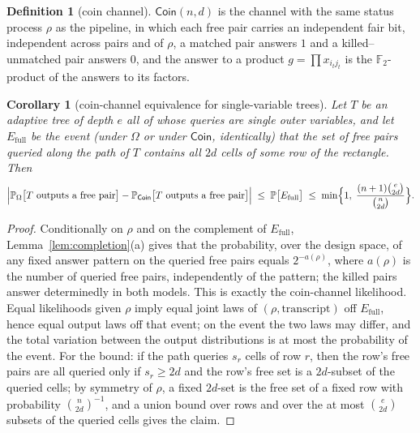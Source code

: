 \documentclass[11pt]{article}
\newtheorem{corollary}[theorem]{Corollary}
\theoremstyle{definition}
\newtheorem{definition}[theorem]{Definition}
\theoremstyle{remark}
\newcommand{\F}{\mathbb{F}}
\newcommand{\Prob}{\mathbb{P}}
\begin{document}
\begin{definition}[coin channel]\label{def:coin}
$\mathsf{Coin}(n,d)$ is the channel with the same status process $\rho$
as the pipeline, in which each free pair carries an independent fair bit,
independent across pairs and of $\rho$, a matched pair answers $1$ and a
killed--unmatched pair answers $0$, and the answer to a product
$g=\prod x_{i_tj_t}$ is the $\F_2$-product of the answers to its
factors.
\end{definition}

\begin{corollary}[coin-channel equivalence for single-variable
trees]\label{cor:coin}
Let $T$ be an adaptive tree of depth $e$ all of whose queries are single
outer variables, and let $E_{\mathrm{full}}$ be the event (under
$\Omega$ or under $\mathsf{Coin}$, identically) that the set of free
pairs queried along the path of $T$ contains all $2d$ cells of some row
of the rectangle.  Then
\[
\Bigl|\Prob_{\Omega}\bigl[T \text{ outputs a free pair}\bigr]
-\Prob_{\mathsf{Coin}}\bigl[T \text{ outputs a free pair}\bigr]\Bigr|
\;\le\;\Prob\bigl[E_{\mathrm{full}}\bigr]
\;\le\;\min\Bigl\{1,\;\frac{(n+1)\binom{e}{2d}}{\binom{n}{2d}}\Bigr\} .
\]
\end{corollary}

\begin{proof}
Conditionally on $\rho$ and on the complement of
$E_{\mathrm{full}}$, Lemma~\ref{lem:completion}(a) gives that the
probability, over the design space, of any fixed
answer pattern on the queried free pairs equals $2^{-a(\rho)}$, where
$a(\rho)$ is the number
of queried free pairs, independently of the pattern; the killed pairs
answer determinedly in both models.  This is exactly the coin-channel
likelihood.  Equal likelihoods given $\rho$ imply equal joint laws of
$(\rho,\text{transcript})$ off $E_{\mathrm{full}}$, hence equal output
laws off that event; on the event the two laws may differ, and the total
variation between the output distributions is at most the probability of
the event.  For the bound: if the path queries $s_r$ cells of row $r$,
then the row's free pairs are all queried only if $s_r\ge2d$ and the
row's free set is a $2d$-subset of the queried cells; by symmetry of
$\rho$, a fixed $2d$-set is the free set of a fixed row with probability
$\binom{n}{2d}^{-1}$, and a union bound over rows and over the at most
$\binom{e}{2d}$ subsets of the queried cells gives the claim.
\end{proof}
\end{document}
